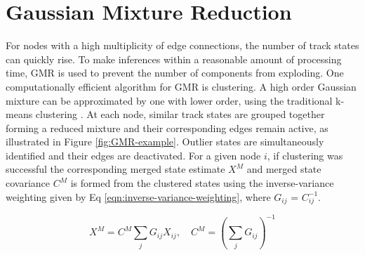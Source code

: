 




\section{Gaussian Mixture Reduction}
\label{section-GMR}
For nodes with a high multiplicity of edge connections, the number of track states can quickly rise. To make inferences within a reasonable amount of processing time, GMR is used to prevent the number of components from exploding. One computationally efficient algorithm for GMR is clustering. A high order Gaussian mixture can be approximated by one with lower order, using the traditional k-means clustering \cite{kmeans}. At each node, similar track states are grouped together forming a reduced mixture and their corresponding edges remain active, as illustrated in Figure \ref{fig:GMR-example}. Outlier states are simultaneously identified and their edges are deactivated. For a given node $i$, if clustering was successful the corresponding merged state estimate $X^{M}$ and merged state covariance $C^{M}$ is formed from the clustered states using the inverse-variance weighting \cite{inverse-variance-weighting} given by Eq \eqref{eqn:inverse-variance-weighting}, where $G_{ij}$ = $C_{ij}^{-1}$.

\begin{equation}
    X^{M} = C^{M} \sum_{j} G_{ij} X_{ij},  \quad  C^{M} = \left( \sum_{j} G_{ij} \right) ^{-1}
    \label{eqn:inverse-variance-weighting}
\end{equation}


